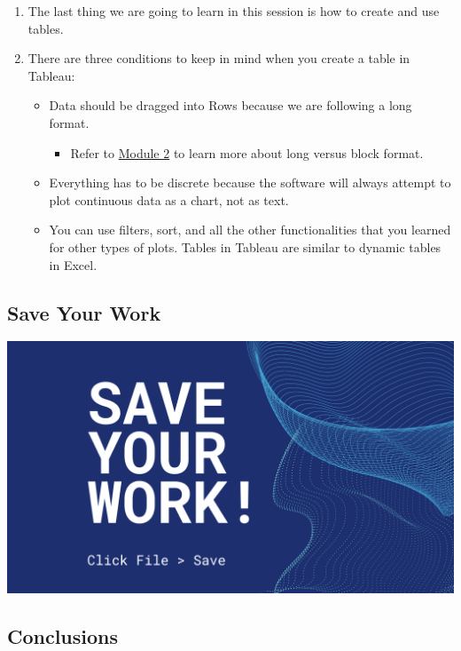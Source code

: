 \documentclass[
]{book}
\providecommand{\tightlist}{%
  \setlength{\itemsep}{0pt}\setlength{\parskip}{0pt}}
\begin{document}
\begin{enumerate}
\def\labelenumi{\arabic{enumi}.}
\tightlist
\item
  The last thing we are going to learn in this session is how to create and use tables.
\item
  There are three conditions to keep in mind when you create a table in Tableau:

  \begin{itemize}
  \tightlist
  \item
    Data should be dragged into Rows because we are following a long format.

    \begin{itemize}
    \tightlist
    \item
      Refer to \protect\hyperlink{data-cleaning-best-practices}{Module 2} to learn more about long versus block format.
    \end{itemize}
  \item
    Everything has to be discrete because the software will always attempt to plot continuous data as a chart, not as text.
  \item
    You can use filters, sort, and all the other functionalities that you learned for other types of plots. Tables in Tableau are similar to dynamic tables in Excel.
  \end{itemize}
\end{enumerate}

\hypertarget{save-your-work}{%
\subsection{Save Your Work}\label{save-your-work}}

\includegraphics{images/M3S3-save-work.png}

\hypertarget{conclusions}{%
\subsection{Conclusions}\label{conclusions}}
\end{document}
